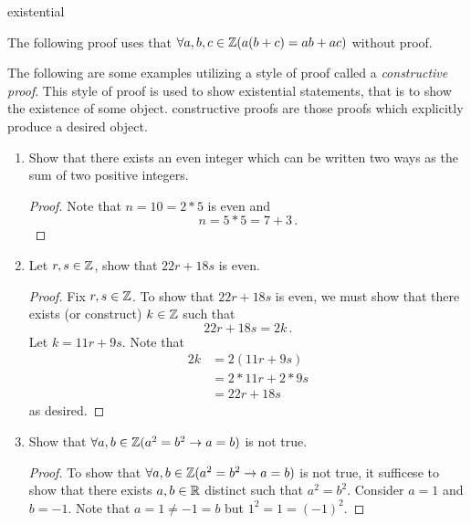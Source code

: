 existential\guard




The following proof uses that $\forall a,b,c\in\mathbb{Z}(a(b+c)=ab+ac)$ without proof.

The following are some examples utilizing a style of proof called a \emph{constructive proof}.
This style of proof is used to show existential statements, that is to show the existence of some object.
constructive proofs are those proofs which explicitly produce a desired object.

\begin{exmp}
\label{exmp:constructiveProofs}
  \begin{enumerate}
    \item  Show that there exists an even integer which can be written two ways as the sum of two positive integers.\\
      \begin{proof}
        Note that $n=10=2*5$ is even and \[ n = 5*5 = 7+3 \,.\]
      \end{proof}
    \item Let $r,s\in\mathbb{Z}$, show that $22r+18s$ is even.
      \begin{proof}
        Fix $r,s\in\mathbb{Z}$.
        To show that $22r+18s$ is even, we must show  that there exists (or construct) $k\in\mathbb{Z}$ such that \[ 22r + 18s = 2k\,.\]
        Let $k=11r+9s$.
        Note that
        \begin{align*}
          2k  &= 2(11r+9s)\\
              &= 2*11r + 2*9s\\
              &= 22r + 18s
        \end{align*}
        as desired.
      \end{proof}
    \item Show that $\forall a,b\in\mathbb{Z}(a^2=b^2 \rightarrow a=b )$ is not true.
    \begin{proof}
      To show that $\forall a,b\in\mathbb{Z}(a^2=b^2 \rightarrow a=b )$ is not true, it sufficese to show that there exists $a,b\in\mathbb{R}$ distinct such that $a^2=b^2$.
      Consider $a=1$ and $b=-1$.
      Note that $a=1\not=-1=b$ but $1^2=1=(-1)^2$.
    \end{proof}
  \end{enumerate}
\end{exmp}
